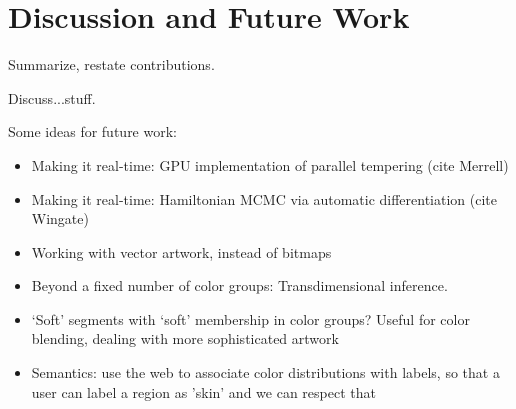 \section{Discussion and Future Work}
\label{sec:discussion}

Summarize, restate contributions.

Discuss...stuff.

Some ideas for future work:
\begin{itemize}
 \item{Making it real-time: GPU implementation of parallel tempering (cite Merrell)}
 \item{Making it real-time: Hamiltonian MCMC via automatic differentiation (cite Wingate)}
 \item{Working with vector artwork, instead of bitmaps}
 \item{Beyond a fixed number of color groups: Transdimensional inference.}
 \item{`Soft' segments with `soft' membership in color groups? Useful for color blending, dealing with more sophisticated artwork}
 \item{Semantics: use the web to associate color distributions with labels, so that a user can label a region as 'skin' and we can respect that}
\end{itemize}